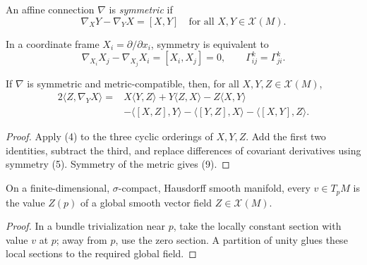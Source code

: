 \begin{definition}
  \label{def:dc-ch2-3-4}
  \leanok
  An affine connection $\nabla$ is \emph{symmetric} if
  \[
    \nabla_XY-\nabla_YX=[X,Y]
    \quad\text{for all }X,Y\in\mathcal{X}(M).\tag{5}
  \]
\end{definition}

\begin{remark}[Remark 3.5]
  \label{rem:dc-ch2-3-5}
  In a coordinate frame $X_i=\partial/\partial x_i$, symmetry is equivalent to
  \[
    \nabla_{X_i}X_j-\nabla_{X_j}X_i=[X_i,X_j]=0,
    \qquad
    \Gamma_{ij}^k=\Gamma_{ji}^k.\tag{5'}
  \]
\end{remark}

\begin{lemma}
  \label{lem:dc-ch2-3-6-koszul}
  \leanok
  If $\nabla$ is symmetric and metric-compatible, then, for all
  $X,Y,Z\in\mathcal{X}(M)$,
  \[
    \begin{aligned}
    2\langle Z,\nabla_YX\rangle
      ={}&X\langle Y,Z\rangle+Y\langle Z,X\rangle-Z\langle X,Y\rangle\\
       &-\langle[X,Z],Y\rangle-\langle[Y,Z],X\rangle
        -\langle[X,Y],Z\rangle.
    \end{aligned}\tag{9}
  \]
\end{lemma}
\begin{proof}
  \leanok
  \sketch
  Apply (4) to the three cyclic orderings of $X,Y,Z$. Add the first two
  identities, subtract the third, and replace differences of covariant
  derivatives using symmetry (5). Symmetry of the metric gives (9).
\end{proof}

\begin{lemma}
  \label{lem:dc-ch2-tangent-extension}
  \leanok
  On a finite-dimensional, $\sigma$-compact, Hausdorff smooth manifold, every
  $v\in T_pM$ is the value $Z(p)$ of a global smooth vector field
  $Z\in\mathcal{X}(M)$.
\end{lemma}
\begin{proof}
  \leanok
  \sketch
  In a bundle trivialization near $p$, take the locally constant section with
  value $v$ at $p$; away from $p$, use the zero section. A partition of unity
  glues these local sections to the required global field.
\end{proof}


